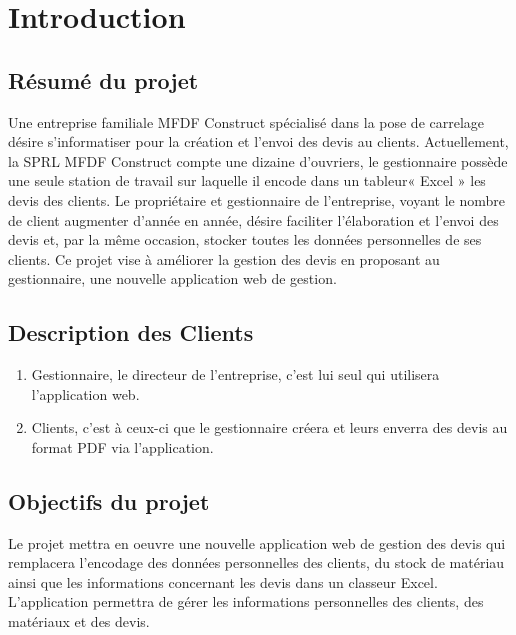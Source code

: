 \section{Introduction}
\subsection{Résumé du projet}
Une entreprise familiale MFDF Construct spécialisé dans la pose de carrelage désire s'informatiser pour la création et l'envoi des devis au clients.
Actuellement, la SPRL MFDF Construct compte une dizaine d'ouvriers, le gestionnaire  possède une seule station de travail sur laquelle il encode dans un tableur« Excel » les devis des  clients.
Le propriétaire et gestionnaire de l’entreprise, voyant le nombre de client augmenter d’année en année, désire
faciliter l'élaboration et l'envoi des devis et, par la même occasion, stocker toutes les données personnelles de ses clients.
Ce projet vise à améliorer la gestion des devis en proposant au gestionnaire, une nouvelle
application web de gestion.


\subsection{Description des Clients}
\begin{enumerate}
\item Gestionnaire, le directeur de l'entreprise, c'est lui seul qui utilisera l'application web.
\item Clients, c'est à ceux-ci que le gestionnaire créera et leurs enverra des devis au format PDF via l'application.
\end{enumerate}


\subsection{Objectifs du projet}
Le projet mettra en oeuvre une nouvelle application web de gestion des devis qui remplacera
l’encodage des données personnelles des clients, du stock de matériau  ainsi que les informations concernant les devis dans un classeur Excel.
L’application permettra de gérer les informations personnelles des clients, des matériaux et des devis.

